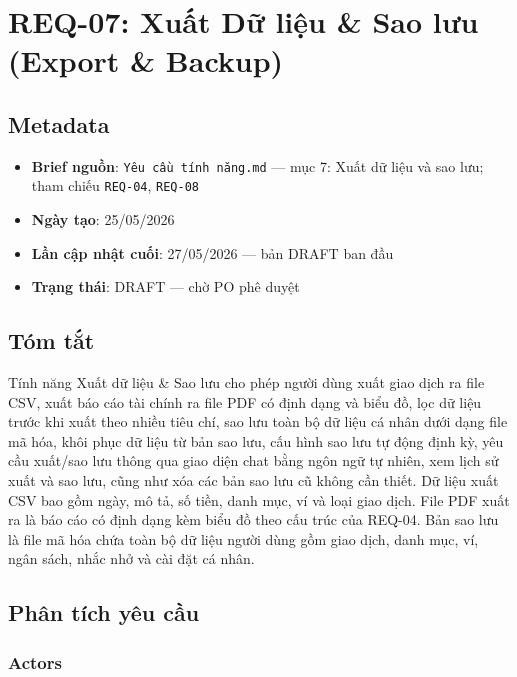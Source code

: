 \section{REQ-07: Xuất Dữ liệu \& Sao lưu (Export \& Backup)}



\subsection{Metadata}

\begin{itemize}
\item \textbf{Brief nguồn}: \texttt{Yêu cầu tính năng.md} — mục 7: Xuất dữ liệu và sao lưu; tham chiếu \texttt{REQ-04}, \texttt{REQ-08}
\item \textbf{Ngày tạo}: 25/05/2026
\item \textbf{Lần cập nhật cuối}: 27/05/2026 — bản DRAFT ban đầu
\item \textbf{Trạng thái}: DRAFT — chờ PO phê duyệt
\end{itemize}
\subsection{Tóm tắt}

Tính năng Xuất dữ liệu \& Sao lưu cho phép người dùng xuất giao dịch ra file CSV, xuất báo cáo tài chính ra file PDF có định dạng và biểu đồ, lọc dữ liệu trước khi xuất theo nhiều tiêu chí, sao lưu toàn bộ dữ liệu cá nhân dưới dạng file mã hóa, khôi phục dữ liệu từ bản sao lưu, cấu hình sao lưu tự động định kỳ, yêu cầu xuất/sao lưu thông qua giao diện chat bằng ngôn ngữ tự nhiên, xem lịch sử xuất và sao lưu, cũng như xóa các bản sao lưu cũ không cần thiết. Dữ liệu xuất CSV bao gồm ngày, mô tả, số tiền, danh mục, ví và loại giao dịch. File PDF xuất ra là báo cáo có định dạng kèm biểu đồ theo cấu trúc của REQ-04. Bản sao lưu là file mã hóa chứa toàn bộ dữ liệu người dùng gồm giao dịch, danh mục, ví, ngân sách, nhắc nhở và cài đặt cá nhân.



\subsection{Phân tích yêu cầu}



\subsubsection{Actors}

